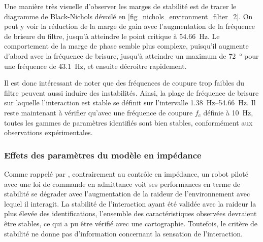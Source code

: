 Une manière très visuelle d'observer les marges de stabilité est de tracer le diagramme de Black-Nichols dévoilé en \cref{fig_nichols_environment_filter_2}. On peut y voir la réduction de la marge de gain avec l'augmentation de la fréquence de brisure du filtre, jusqu'à atteindre le point critique à \SI{54.66}{\hertz}. Le comportement de la marge de phase semble plus complexe, puisqu'il augmente d'abord avec la fréquence de brisure, jusqu'à atteindre un maximum de \SI{72}{\degree} pour une fréquence de \SI{43.1}{\hertz}, et ensuite décroitre rapidement.

%


Il est donc intéressant de noter que des fréquences de coupure trop faibles du filtre peuvent aussi induire des instabilités. %
Ainsi, la plage de fréquence de brisure sur laquelle l'interaction est stable se définit sur l'intervalle \SIrange{1.38}{54.66}{\hertz}. %
Il reste maintenant à vérifier qu'avec une fréquence de coupure $f_c$ définie à \SI{10}{\hertz}, toutes les gammes de paramètres identifiés sont bien stables, conformément aux observations expérimentales.

\subsubsection{Effets des paramètres du modèle en impédance} \label{chap5_sec_stability_study_sub_env_2}

Comme rappelé par \textcite{ott_unified_2010}, contrairement au contrôle en impédance, un robot piloté avec une loi de commande en admittance voit ses performances en terme de stabilité se dégrader avec l'augmentation de la raideur de l'environnement avec lequel il interagit. La stabilité de l'interaction ayant été validée avec la raideur la plus élevée des identifications, l'ensemble des caractéristiques observées devraient être stables, ce qui a pu être vérifié avec une cartographie. Toutefois, le critère de stabilité ne donne pas d'information concernant la sensation de l'interaction.


